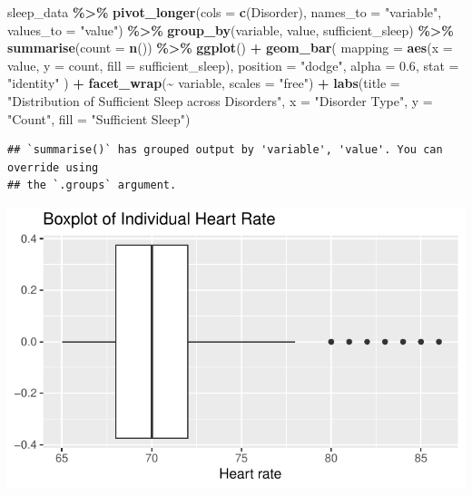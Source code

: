 \documentclass[
  11pt,
]{article}
\newenvironment{Shaded}{\begin{snugshade}}{\end{snugshade}}
\newcommand{\AttributeTok}[1]{\textcolor[rgb]{0.13,0.29,0.53}{#1}}
\newcommand{\FloatTok}[1]{\textcolor[rgb]{0.00,0.00,0.81}{#1}}
\newcommand{\FunctionTok}[1]{\textcolor[rgb]{0.13,0.29,0.53}{\textbf{#1}}}
\newcommand{\NormalTok}[1]{#1}
\newcommand{\SpecialCharTok}[1]{\textcolor[rgb]{0.81,0.36,0.00}{\textbf{#1}}}
\newcommand{\StringTok}[1]{\textcolor[rgb]{0.31,0.60,0.02}{#1}}
\begin{document}
\begin{Shaded}
\begin{Highlighting}[]
\NormalTok{sleep\_data }\SpecialCharTok{\%\textgreater{}\%}
  \FunctionTok{pivot\_longer}\NormalTok{(}\AttributeTok{cols =} \FunctionTok{c}\NormalTok{(Disorder), }\AttributeTok{names\_to =} \StringTok{"variable"}\NormalTok{, }\AttributeTok{values\_to =} \StringTok{"value"}\NormalTok{) }\SpecialCharTok{\%\textgreater{}\%}
  \FunctionTok{group\_by}\NormalTok{(variable, value, sufficient\_sleep) }\SpecialCharTok{\%\textgreater{}\%}
  \FunctionTok{summarise}\NormalTok{(}\AttributeTok{count =} \FunctionTok{n}\NormalTok{()) }\SpecialCharTok{\%\textgreater{}\%}
  \FunctionTok{ggplot}\NormalTok{() }\SpecialCharTok{+}
  \FunctionTok{geom\_bar}\NormalTok{(}
    \AttributeTok{mapping =} \FunctionTok{aes}\NormalTok{(}\AttributeTok{x =}\NormalTok{ value, }\AttributeTok{y =}\NormalTok{ count, }\AttributeTok{fill =}\NormalTok{ sufficient\_sleep),}
    \AttributeTok{position =} \StringTok{"dodge"}\NormalTok{,   }
    \AttributeTok{alpha =} \FloatTok{0.6}\NormalTok{,}
    \AttributeTok{stat =} \StringTok{"identity"}
\NormalTok{  ) }\SpecialCharTok{+}
  \FunctionTok{facet\_wrap}\NormalTok{(}\SpecialCharTok{\textasciitilde{}}\NormalTok{ variable, }\AttributeTok{scales =} \StringTok{"free"}\NormalTok{) }\SpecialCharTok{+}
  \FunctionTok{labs}\NormalTok{(}\AttributeTok{title =} \StringTok{"Distribution of Sufficient Sleep across Disorders"}\NormalTok{,}
       \AttributeTok{x =} \StringTok{"Disorder Type"}\NormalTok{, }
       \AttributeTok{y =} \StringTok{"Count"}\NormalTok{, }
       \AttributeTok{fill =} \StringTok{"Sufficient Sleep"}\NormalTok{)}
\end{Highlighting}
\end{Shaded}

\begin{verbatim}
## `summarise()` has grouped output by 'variable', 'value'. You can override using
## the `.groups` argument.
\end{verbatim}

\begin{center}\includegraphics[width=0.7\linewidth]{SleepHelath_files/figure-latex/unnamed-chunk-39-1} \end{center}
\end{document}
